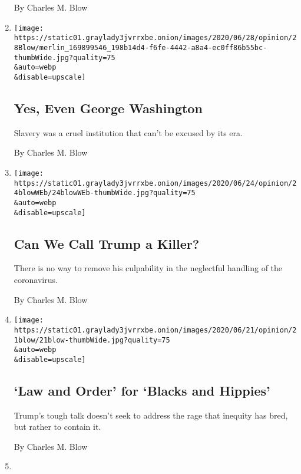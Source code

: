 \begin{enumerate}
  By Charles M. Blow
\item
  \href{/2020/06/28/opinion/george-washington-confederate-statues.html}{}

  \texttt{[image: https://static01.graylady3jvrrxbe.onion/images/2020/06/28/opinion/28Blow/merlin\_169899546\_198b14d4-f6fe-4442-a8a4-ec0ff86b55bc-thumbWide.jpg?quality=75\\\&auto=webp\\\&disable=upscale]}

  \hypertarget{yes-even-george-washington}{%
  \subsection{Yes, Even George
  Washington}\label{yes-even-george-washington}}

  Slavery was a cruel institution that can't be excused by its era.

  By Charles M. Blow
\item
  \href{/2020/06/24/opinion/trump-coronavirus-deaths.html}{}

  \texttt{[image: https://static01.graylady3jvrrxbe.onion/images/2020/06/24/opinion/24blowWEb/24blowWEb-thumbWide.jpg?quality=75\\\&auto=webp\\\&disable=upscale]}

  \hypertarget{can-we-call-trump-a-killer}{%
  \subsection{Can We Call Trump a
  Killer?}\label{can-we-call-trump-a-killer}}

  There is no way to remove his culpability in the neglectful handling
  of the coronavirus.

  By Charles M. Blow
\item
  \href{/2020/06/21/opinion/trump-police-reform.html}{}

  \texttt{[image: https://static01.graylady3jvrrxbe.onion/images/2020/06/21/opinion/21blow/21blow-thumbWide.jpg?quality=75\\\&auto=webp\\\&disable=upscale]}

  \hypertarget{law-and-order-for-blacks-and-hippies}{%
  \subsection{`Law and Order' for `Blacks and
  Hippies'}\label{law-and-order-for-blacks-and-hippies}}

  Trump's tough talk doesn't seek to address the rage that inequity has
  bred, but rather to contain it.

  By Charles M. Blow
\item
  \href{/2020/06/14/opinion/us-protests-racism.html}{}


\end{enumerate}
